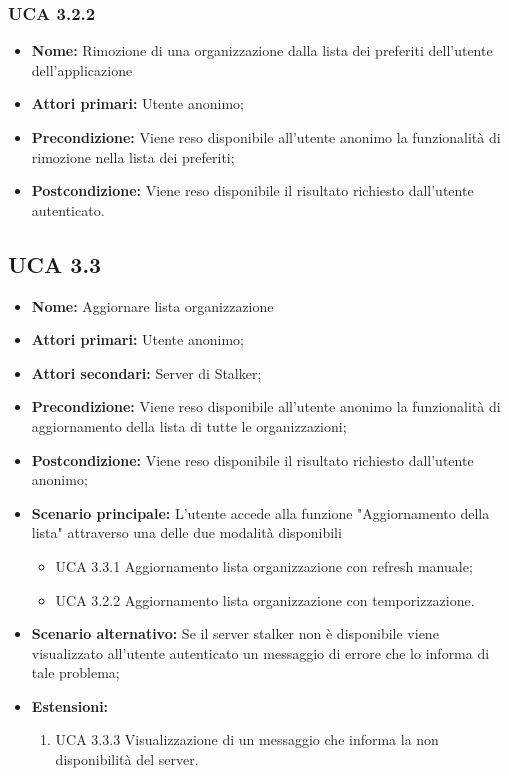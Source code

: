 \subsubsection{UCA 3.2.2}%
\begin{itemize}
	\item \textbf{Nome:} Rimozione di una organizzazione dalla lista dei preferiti dell’utente dell’applicazione
	\item \textbf{Attori primari:} Utente anonimo;
	\item \textbf{Precondizione:} Viene reso disponibile all’utente anonimo la funzionalità di rimozione nella lista dei preferiti;
	\item \textbf{Postcondizione:} Viene reso disponibile il risultato richiesto dall’utente autenticato.
\end{itemize}

\subsection{UCA 3.3}%
\begin{itemize}
	\item \textbf{Nome:} Aggiornare lista organizzazione 
	\item \textbf{Attori primari:} Utente anonimo;
	\item \textbf{Attori secondari:} Server di Stalker;
	\item \textbf{Precondizione:} Viene reso disponibile all’utente anonimo la funzionalità di aggiornamento della lista di tutte le organizzazioni;
	\item \textbf{Postcondizione:} Viene reso disponibile il risultato richiesto dall’utente anonimo;
	\item \textbf{Scenario principale:}  L’utente accede alla funzione "Aggiornamento della lista" attraverso una delle due modalità disponibili
	\begin{itemize}
		\item UCA 3.3.1 Aggiornamento lista organizzazione con refresh manuale;
		\item UCA 3.2.2 Aggiornamento lista organizzazione con temporizzazione.
	\end{itemize}
	\item \textbf{Scenario alternativo:} Se il server stalker non è disponibile viene visualizzato all’utente autenticato un messaggio di errore che lo informa di tale problema;
	\item \textbf{Estensioni:}
	\begin{enumerate}
		\item UCA 3.3.3 Visualizzazione di un messaggio che informa la non disponibilità del server.
	\end{enumerate}
\end{itemize}

